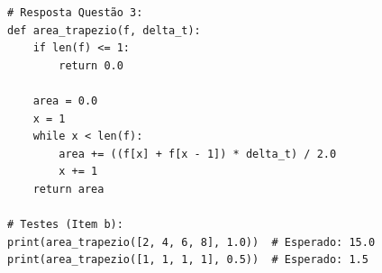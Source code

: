 \ifmostrarGabarito
\begin{verbatim}
# Resposta Questão 3:
def area_trapezio(f, delta_t):
    if len(f) <= 1:
        return 0.0
    
    area = 0.0
    x = 1
    while x < len(f):
        area += ((f[x] + f[x - 1]) * delta_t) / 2.0
        x += 1
    return area

# Testes (Item b):
print(area_trapezio([2, 4, 6, 8], 1.0))  # Esperado: 15.0
print(area_trapezio([1, 1, 1, 1], 0.5))  # Esperado: 1.5
\end{verbatim}
\fi
